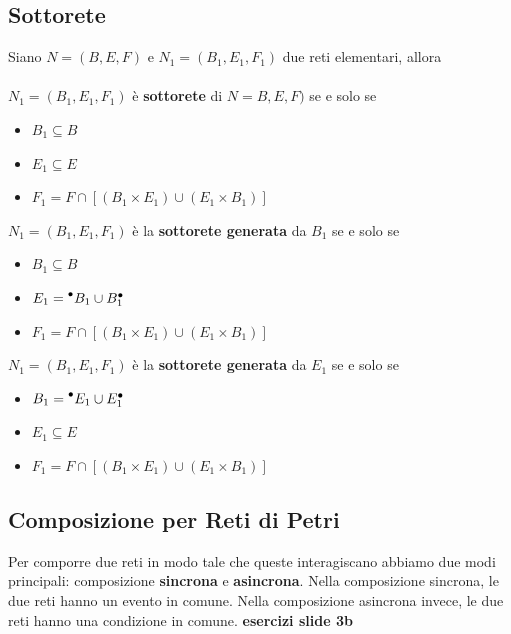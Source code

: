\subsection{Sottorete}
Siano $N = (B, E, F)$ e $N_1 = (B_1, E_1, F_1)$ due reti elementari, allora
\\
\\
$N_1 = (B_1, E_1, F_1)$ è \textbf{sottorete} di $N = B, E, F)$ se e solo se
\begin{itemize}
	\item $B_1 \subseteq B$
	\item $E_1 \subseteq E$
	\item $F_1 = F \cap [(B_1 \times E_1) \cup (E_1 \times B_1) ]$
\end{itemize}

\noindent
$N_1 = (B_1, E_1, F_1)$ è la \textbf{sottorete generata} da $B_1$ se e solo se
\begin{itemize}
	\item $B_1 \subseteq B$
	\item $E_1 = \prescript{\bullet}{}{B_1} \cup B_1^\bullet$
    \item $F_1 = F \cap [(B_1 \times E_1)\cup(E_1 \times B_1)]$
\end{itemize}

\noindent
$N_1 = (B_1, E_1, F_1)$ è la \textbf{sottorete generata} da $E_1$ se e solo se
\begin{itemize}
    \item $B_1 = \prescript{\bullet}{}{E_1} \cup E_1^\bullet$
	\item $E_1 \subseteq E$
    \item $F_1 = F \cap [(B_1 \times E_1)\cup(E_1 \times B_1)]$
\end{itemize}

\subsection{Composizione per Reti di Petri}
Per comporre due reti in modo tale che queste interagiscano abbiamo due modi principali: composizione \textbf{sincrona} e \textbf{asincrona}. Nella composizione sincrona, le due reti hanno un evento in comune. Nella composizione asincrona invece, le due reti hanno una condizione in comune.
\textbf{esercizi slide 3b}
